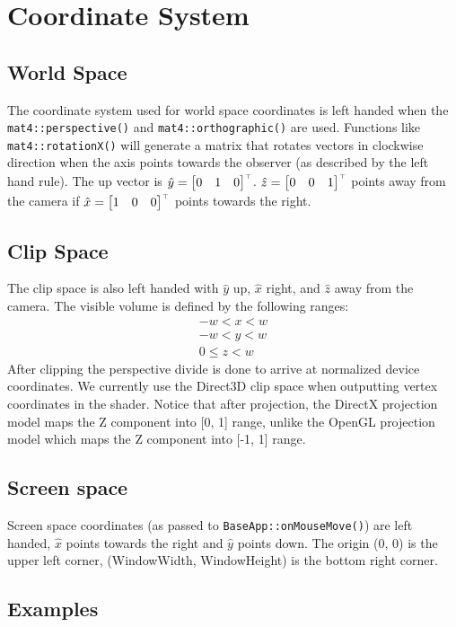 \documentclass{article}
\renewcommand{\Vec}[1]{#1}
\newcommand{\BuildMat}[1]{\left[\begin{matrix}#1\end{matrix}\right]}
\newcommand{\transpose}{^{\mathstrut\scriptscriptstyle{\top}}}
\let\lstInline\lstinline %
\newcommand{\InlCode}[1]{\lstInline[basicstyle=\ttfamily]{#1}}
\begin{document}
\section{Coordinate System}
\subsection{World Space}
The coordinate system used for world space coordinates is left handed when the \InlCode{mat4::perspective()} and \InlCode{mat4::orthographic()} are used.
Functions like \InlCode{mat4::rotationX()} will generate a matrix that rotates vectors in clockwise direction when the axis points towards the observer (as described by the left hand rule).
The up vector is $\Vec{\hat y} = \BuildMat{0&1&0}\transpose$.
$\Vec{\hat z} = \BuildMat{0&0&1}\transpose$ points away from the camera if $\Vec{\hat x} = \BuildMat{1&0&0}\transpose$ points towards the right.

\subsection{Clip Space}
The clip space is also left handed with $\Vec{\hat y}$ up, $\Vec{\hat x}$ right, and $\Vec{\hat z}$ away from the camera.
The visible volume is defined by the following ranges:
\begin{align*}
-w<x<w\\
-w<y<w\\
0\leq z<w
\end{align*}
After clipping the perspective divide is done to arrive at normalized device coordinates. We currently use the Direct3D clip space when outputting vertex coordinates in the shader. Notice that after projection, the DirectX projection model maps the Z component into [0, 1] range, unlike the OpenGL projection model which maps the Z component into [-1, 1] range. 

\subsection{Screen space}
Screen space coordinates (as passed to \InlCode{BaseApp::onMouseMove()}) are left handed, $\Vec{\hat x}$ points towards the right and $\Vec{\hat y}$ points down. The origin (0, 0) is the upper left corner, (WindowWidth, WindowHeight) is the bottom right corner.


\subsection{Examples}
\end{document}
